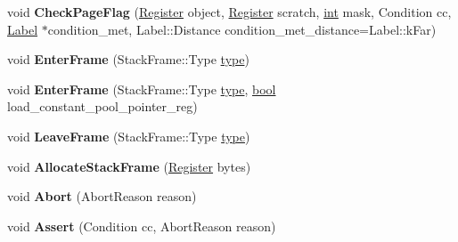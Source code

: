 \begin{DoxyCompactItemize}
\item 
\mbox{\label{classv8_1_1internal_1_1TurboAssembler_af9ac2510de674a7d5f3289a74cc0701d}} 
void {\bfseries Check\+Page\+Flag} (\mbox{\hyperlink{classv8_1_1internal_1_1Register}{Register}} object, \mbox{\hyperlink{classv8_1_1internal_1_1Register}{Register}} scratch, \mbox{\hyperlink{classint}{int}} mask, Condition cc, \mbox{\hyperlink{classv8_1_1internal_1_1Label}{Label}} $\ast$condition\+\_\+met, Label\+::\+Distance condition\+\_\+met\+\_\+distance=Label\+::k\+Far)
\item 
\mbox{\label{classv8_1_1internal_1_1TurboAssembler_a4aea206c1c673c33c7ef241e8bca04ea}} 
void {\bfseries Enter\+Frame} (Stack\+Frame\+::\+Type \mbox{\hyperlink{classstd_1_1conditional_1_1type}{type}})
\item 
\mbox{\label{classv8_1_1internal_1_1TurboAssembler_af705c58e218094857590d07367afb65f}} 
void {\bfseries Enter\+Frame} (Stack\+Frame\+::\+Type \mbox{\hyperlink{classstd_1_1conditional_1_1type}{type}}, \mbox{\hyperlink{classbool}{bool}} load\+\_\+constant\+\_\+pool\+\_\+pointer\+\_\+reg)
\item 
\mbox{\label{classv8_1_1internal_1_1TurboAssembler_a6fcf697a920fa427114a1923f03da4d8}} 
void {\bfseries Leave\+Frame} (Stack\+Frame\+::\+Type \mbox{\hyperlink{classstd_1_1conditional_1_1type}{type}})
\item 
\mbox{\label{classv8_1_1internal_1_1TurboAssembler_a4dd19facd1c9ec0eb49451e07ce5fa20}} 
void {\bfseries Allocate\+Stack\+Frame} (\mbox{\hyperlink{classv8_1_1internal_1_1Register}{Register}} bytes)
\item 
\mbox{\label{classv8_1_1internal_1_1TurboAssembler_a714d3b6a967aed8110ff6170772850ec}} 
void {\bfseries Abort} (Abort\+Reason reason)
\item 
\mbox{\label{classv8_1_1internal_1_1TurboAssembler_a33f2e6fdeaa4391268248d469fed8ecf}} 
void {\bfseries Assert} (Condition cc, Abort\+Reason reason)
\item 

\end{DoxyCompactItemize}
